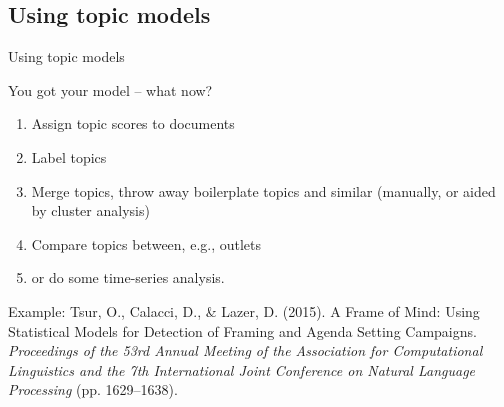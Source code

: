 \documentclass[handout]{beamer}
\begin{document}

\subsection{Using topic models}

\begin{frame}{Using topic models}
	
	You got your model -- what now?
	
	\begin{enumerate}
		\item Assign topic scores to documents
		\item Label topics
		\item Merge topics, throw away boilerplate topics and similar (manually, or aided by cluster analysis)
		\item Compare topics between, e.g., outlets
		\item or do some time-series analysis.
	\end{enumerate}
	
	
	Example:
	\tiny{Tsur, O., Calacci, D., \& Lazer, D. (2015). A Frame of Mind: Using Statistical Models for Detection of Framing and Agenda Setting Campaigns. \textit{Proceedings of the 53rd Annual Meeting of the Association for Computational Linguistics and the 7th International Joint Conference on Natural Language Processing} (pp. 1629–1638).}
	
	
	
\end{frame}
\end{document}

